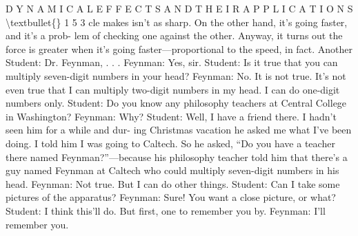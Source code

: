 \documentclass[10pt,oneside]{article}
\begin{document}
D Y N A M I C A L  E F F E C T S  A N D  T H E I R  A P P L I C A T I O N S \textbackslash{}textbullet\{\} 1 5 3 cle makes isn’t as sharp. On the other hand, it’s going faster, and it’s a prob- lem of checking one against the other. Anyway, it turns out the force is greater when it’s going faster---proportional to the speed, in fact. Another Student: Dr. Feynman, . . . Feynman: Yes, sir. Student: Is it true that you can multiply seven-digit numbers in your head? Feynman: No. It is not true. It’s not even true that I can multiply two-digit numbers in my head. I can do one-digit numbers only. Student: Do you know any philosophy teachers at Central College in Washington? Feynman: Why? Student: Well, I have a friend there. I hadn’t seen him for a while and dur- ing Christmas vacation he asked me what I’ve been doing. I told him I was going to Caltech. So he asked, “Do you have a teacher there named Feynman?”---because his philosophy teacher told him that there’s a guy named Feynman at Caltech who could multiply seven-digit numbers in his head. Feynman: Not true. But I can do other things. Student: Can I take some pictures of the apparatus? Feynman: Sure! You want a close picture, or what? Student: I think this’ll do. But first, one to remember you by. Feynman: I’ll remember you.\par

\clearpage
{}
\end{document}
